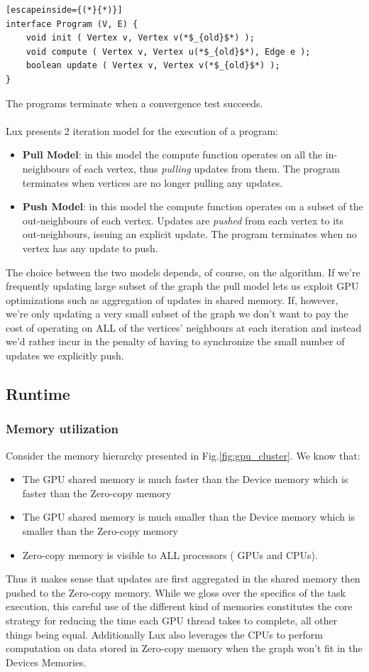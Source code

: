 \documentclass[]{article}
\begin{document}
\begin{lstlisting}[escapeinside={(*}{*)}]
interface Program (V, E) {
    void init ( Vertex v, Vertex v(*$_{old}$*) );
    void compute ( Vertex v, Vertex u(*$_{old}$*), Edge e );
    boolean update ( Vertex v, Vertex v(*$_{old}$*) );
}
\end{lstlisting}
The programs terminate when a convergence test succeeds.\\\\
Lux presents 2 iteration model for the execution of a program:
\begin{itemize}
	\item \textbf{Pull Model}: in this model the compute function operates on all the in-neighbours of each vertex, thus \textit{pulling} updates from them. The program terminates when vertices are no longer pulling any updates.
	\item \textbf{Push Model}: in this model the compute function operates on a subset of the out-neighbours of each vertex. Updates are \textit{pushed} from each vertex to its out-neighbours, issuing an explicit update. The program terminates when no vertex has any update to push.
\end{itemize}
The choice between the two models depends, of course, on the algorithm. If we're frequently updating large subset of the graph the pull model lets us exploit GPU optimizations such as aggregation of updates in shared memory. If, however, we're only updating a very small subset of the graph we don't want to pay the cost of operating on ALL of the vertices' neighbours at each iteration and instead we'd rather incur in the penalty of having to synchronize the small number of updates we explicitly push.

\subsection{Runtime}
\subsubsection{Memory utilization}
Consider the memory hierarchy presented in Fig.\ref{fig:gpu_cluster}. We know that:
\begin{itemize}
	\item The GPU shared memory is much faster than the Device memory which is faster than the Zero-copy memory
	\item The GPU shared memory is much smaller than the Device memory which is smaller than the Zero-copy memory
	\item Zero-copy memory is visible to ALL processors ( GPUs and CPUs).
\end{itemize}
Thus it makes sense that updates are first aggregated in the shared memory then pushed to the Zero-copy memory. While we gloss over the specifics of the task execution, this careful use of the different kind of memories constitutes the core strategy for reducing the time each GPU thread takes to complete, all other things being equal. Additionally Lux also leverages the CPUs to perform computation on data stored in Zero-copy memory when the graph won't fit in the Devices Memories.
\end{document}
